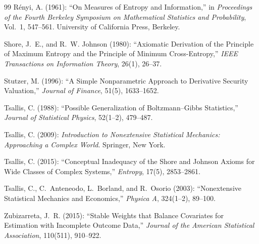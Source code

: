 \documentclass[11pt]{article}
\begin{document}
\begin{thebibliography}{99}
R\'enyi, A. (1961): ``On Measures of Entropy and Information,'' in
\textit{Proceedings of the Fourth Berkeley Symposium on Mathematical
Statistics and Probability}, Vol.~1, 547--561. University of California Press, Berkeley.

Shore, J.~E., and R.~W. Johnson (1980): ``Axiomatic Derivation of the
Principle of Maximum Entropy and the Principle of Minimum Cross-Entropy,''
\textit{IEEE Transactions on Information Theory}, 26(1), 26--37.

Stutzer, M. (1996): ``A Simple Nonparametric Approach to Derivative Security
Valuation,'' \textit{Journal of Finance}, 51(5), 1633--1652.

Tsallis, C. (1988): ``Possible Generalization of Boltzmann--Gibbs
Statistics,'' \textit{Journal of Statistical Physics}, 52(1--2), 479--487.

Tsallis, C. (2009): \textit{Introduction to Nonextensive Statistical
Mechanics: Approaching a Complex World}. Springer, New York.

Tsallis, C. (2015): ``Conceptual Inadequacy of the Shore and Johnson Axioms
for Wide Classes of Complex Systems,'' \textit{Entropy}, 17(5), 2853--2861.

Tsallis, C., C.~Anteneodo, L.~Borland, and R.~Osorio (2003): ``Nonextensive
Statistical Mechanics and Economics,'' \textit{Physica A}, 324(1--2), 89--100.

Zubizarreta, J.~R. (2015): ``Stable Weights that Balance Covariates for
Estimation with Incomplete Outcome Data,'' \textit{Journal of the American
Statistical Association}, 110(511), 910--922.
\end{thebibliography}
\end{document}
